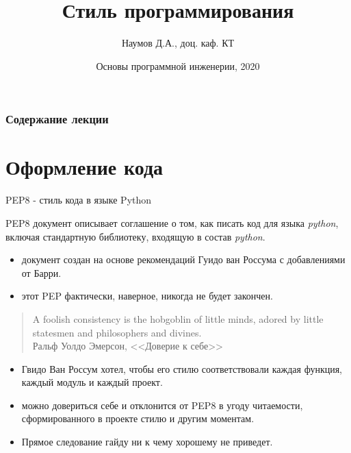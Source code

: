 \documentclass[xcolor=table]{beamer}
\title[Software Design]{Стиль программирования}
\author{Наумов Д.А., доц. каф. КТ}
\date[15.11.2020] {Основы программной инженерии, 2020}
\begin{document}
\begin{frame}
  \titlepage
\end{frame}
  
\begin{frame}
  \frametitle{Содержание лекции}
  \tableofcontents  
\end{frame}

\section{Оформление кода}

\begin{frame}{PEP8 - стиль кода в языке Python}
	\begin{block}{PEP8}
		документ описывает соглашение о том, как писать код для языка \textit{python}, включая стандартную библиотеку, входящую в состав \textit{python}. 	
	\end{block}
	\begin{itemize}
		\item документ создан на основе рекомендаций Гуидо ван Россума с добавлениями от Барри. 
		\item этот PEP фактически, наверное, никогда не будет закончен.
	\end{itemize}	
	\begin{quotation}
	A foolish consistency is the hobgoblin of little minds, adored by little statesmen and philosophers and divines. \\
	Ральф Уолдо Эмерсон, <<Доверие к себе>>	
	\end{quotation}
	\begin{itemize}
		\item Гвидо Ван Россум хотел, чтобы его стилю соответствовали каждая функция, каждый модуль и каждый проект. 
		\item можно довериться себе и отклонится от PEP8 в угоду читаемости, сформированного в проекте стилю и другим моментам.
		\item Прямое следование гайду ни к чему хорошему не приведет.
	\end{itemize}	
\end{frame}
\end{document}
